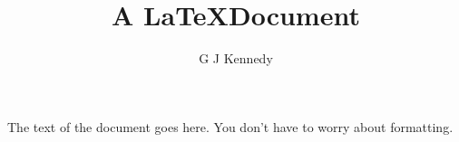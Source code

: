 \documentclass[twocolumn]
{article}
\begin{document}
\title{A \LaTeX Document}
\author{G J Kennedy}
\maketitle
The text of the document goes here. You don't have to worry about formatting.
\end{document}
